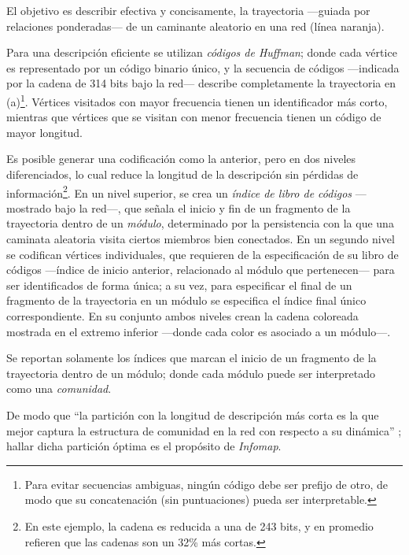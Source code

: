 \documentclass[letterpaper, 11pt]{book}
\theoremstyle{definition}
\theoremstyle{remark}
\begin{document}
\begin{description}
    \setlength\itemsep{0em}
    \item[(a)] El objetivo es describir efectiva y concisamente, la trayectoria ---guiada por relaciones ponderadas--- de un caminante aleatorio en una red (línea naranja). 
    \item[(b)] Para una descripción eficiente se utilizan \emph{códigos de Huffman}; donde cada vértice es representado por un código binario único, y la secuencia de códigos ---indicada por la cadena de 314 bits bajo la red--- describe completamente la trayectoria en (a)\footnote{
	Para evitar secuencias ambiguas, ningún código debe ser prefijo de otro, de modo que su concatenación (sin puntuaciones) pueda ser interpretable.}. 
    Vértices visitados con mayor frecuencia tienen un identificador más corto, mientras que vértices que se visitan con menor frecuencia tienen un código de mayor longitud. 
    \item[(c)] Es posible generar una codificación como la anterior, pero en dos niveles diferenciados, lo cual reduce la longitud de la descripción sin pérdidas de información\footnote{
	En este ejemplo, la cadena es reducida a una de 243 bits, y en promedio \citet{2009_Rosvall_MapEquation} refieren que las cadenas son un 32\% más cortas.}. 
    En un nivel superior, se crea un \emph{índice de libro de códigos} ---mostrado bajo la red---, que señala el inicio y fin de un fragmento de la trayectoria dentro de un \emph{módulo}, determinado por la persistencia con la que una caminata aleatoria visita ciertos miembros bien conectados. 
    En un segundo nivel se codifican vértices individuales, que requieren de la especificación de su libro de códigos ---índice de inicio anterior, relacionado al módulo que pertenecen--- para ser identificados de forma única; a su vez, para especificar el final de un fragmento de la trayectoria en un módulo se especifica el índice final único correspondiente. 
    En su conjunto ambos niveles crean la cadena coloreada mostrada en el extremo inferior ---donde cada color es asociado a un módulo---. 
    \item[(d)] Se reportan solamente los índices que marcan el inicio de un fragmento de la trayectoria dentro de un módulo; donde cada módulo puede ser interpretado como una \emph{comunidad}. 
\end{description}


De modo que ``la partición con la longitud de descripción más corta es la que mejor captura la estructura de comunidad en la red con respecto a su dinámica'' \citep[6]{2014_Rosvall_CommunityMapEq}; hallar dicha partición óptima es el propósito de \emph{Infomap}. 
\end{document}
